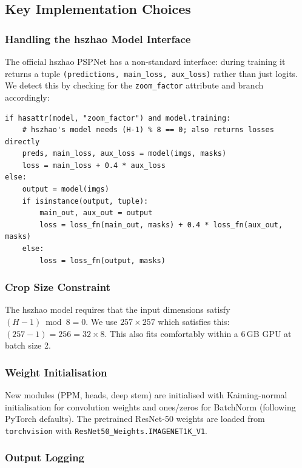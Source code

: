 \documentclass[12pt,a4paper]{article}
\newcommand{\code}[1]{\texttt{#1}}
\begin{document}
\subsection{Key Implementation Choices}

\subsubsection*{Handling the hszhao Model Interface}

The official hszhao PSPNet has a non-standard interface: during training it
returns a tuple \code{(predictions, main\_loss, aux\_loss)} rather than just
logits.  We detect this by checking for the \code{zoom\_factor} attribute and
branch accordingly:

\begin{lstlisting}[caption={Handling both model interfaces in the training loop.}]
if hasattr(model, "zoom_factor") and model.training:
    # hszhao's model needs (H-1) % 8 == 0; also returns losses directly
    preds, main_loss, aux_loss = model(imgs, masks)
    loss = main_loss + 0.4 * aux_loss
else:
    output = model(imgs)
    if isinstance(output, tuple):
        main_out, aux_out = output
        loss = loss_fn(main_out, masks) + 0.4 * loss_fn(aux_out, masks)
    else:
        loss = loss_fn(output, masks)
\end{lstlisting}

\subsubsection*{Crop Size Constraint}

The hszhao model requires that the input dimensions satisfy
$(H - 1) \bmod 8 = 0$.  We use $257 \times 257$ which satisfies this:
$(257 - 1) = 256 = 32 \times 8$.  This also fits comfortably within a 6\,GB
GPU at batch size 2.

\subsubsection*{Weight Initialisation}

New modules (PPM, heads, deep stem) are initialised with Kaiming-normal
initialisation for convolution weights and ones/zeros for BatchNorm
(following PyTorch defaults).  The pretrained ResNet-50 weights are loaded
from \code{torchvision} with \code{ResNet50\_Weights.IMAGENET1K\_V1}.

\subsubsection*{Output Logging}
\end{document}

